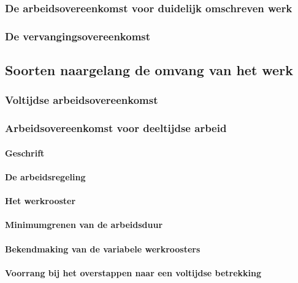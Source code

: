 \subsubsection{De arbeidsovereenkomst voor duidelijk omschreven werk}

\subsubsection{De vervangingsovereenkomst}

\subsection{Soorten naargelang de omvang van het werk}

\subsubsection{Voltijdse arbeidsovereenkomst}

\subsubsection{Arbeidsovereenkomst voor deeltijdse arbeid}

\paragraph{Geschrift}

\paragraph{De arbeidsregeling}

\paragraph{Het werkrooster}

\paragraph{Minimumgrenen van de arbeidsduur}

\paragraph{Bekendmaking van de variabele werkroosters}

\paragraph{Voorrang bij het overstappen naar een voltijdse betrekking}

